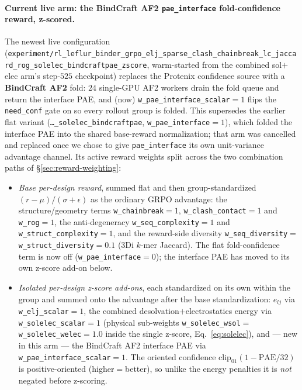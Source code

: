 \documentclass[11pt]{article}
\newcommand{\ttk}[1]{\texttt{\small #1}}
\begin{document}
\paragraph{Current live arm: the BindCraft AF2 \ttk{pae\_interface} fold-confidence reward, z-scored.} The
newest live configuration
(\ttk{experiment/rl\_leflur\_binder\_grpo\_elj\_sparse\_clash\_chainbreak\_lc\_jaccard\_rog\_solelec\_bindcraftpae\_zscore},
warm-started from the combined sol$+$elec arm's step-$525$ checkpoint) replaces the Protenix
confidence source with a \textbf{BindCraft AF2} fold: $24$ single-GPU AF2 workers drain the fold
queue and return the interface PAE, and (now) \ttk{w\_pae\_interface\_scalar}$=1$ flips the \ttk{need\_conf} gate on
so every rollout group is folded. This supersedes the earlier flat variant
(\ttk{\ldots\_solelec\_bindcraftpae}, \ttk{w\_pae\_interface}$=1$), which folded the interface PAE into the
shared base-reward normalization; that arm was cancelled and replaced once we chose to give
\ttk{pae\_interface} its own unit-variance advantage channel. Its active reward weights split across the two combination paths of
\S\ref{sec:reward-weighting}:
\begin{itemize}
\item \emph{Base per-design reward}, summed flat and then group-standardized $(r-\mu)/(\sigma+\epsilon)$
as the ordinary GRPO advantage: the structure/geometry terms \ttk{w\_chainbreak}$=1$,
\ttk{w\_clash\_contact}$=1$ and \ttk{w\_rog}$=1$, the anti-degeneracy \ttk{w\_seq\_complexity}$=1$ and
\ttk{w\_struct\_complexity}$=1$, and the reward-side diversity
\ttk{w\_seq\_diversity}$=$\ttk{w\_struct\_diversity}$=0.1$ (3Di $k$-mer Jaccard). The flat fold-confidence
term is now off (\ttk{w\_pae\_interface}$=0$); the interface PAE has moved to its own z-score add-on below.
\item \emph{Isolated per-design z-score add-ons}, each standardized on its own within the group and
summed onto the advantage after the base standardization: $e_{lj}$ via \ttk{w\_elj\_scalar}$=1$, the
combined desolvation$+$electrostatics energy via \ttk{w\_solelec\_scalar}$=1$ (physical sub-weights
\ttk{w\_solelec\_wsol}$=$\ttk{w\_solelec\_welec}$=1.0$ inside the single z-score, Eq.~\ref{eq:solelec}),
and --- new in this arm --- the BindCraft AF2 interface PAE via \ttk{w\_pae\_interface\_scalar}$=1$. The
oriented confidence $\mathrm{clip}_{01}(1-\mathrm{PAE}/32)$ is positive-oriented (higher${=}$better), so
unlike the energy penalties it is \emph{not} negated before z-scoring.
\end{itemize}
\end{document}
